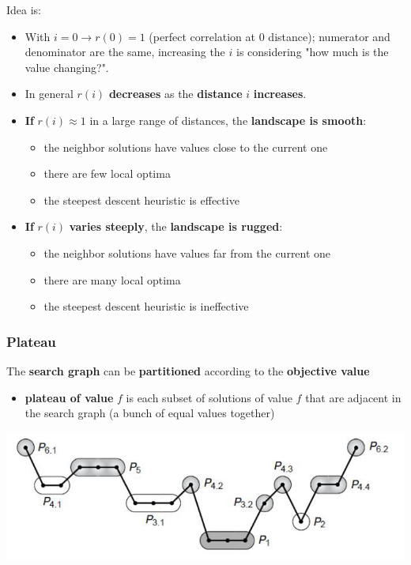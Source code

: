 \documentclass[11pt]{article}
\begin{document}
	Idea is:
	\begin{itemize}
		\item With $i=0 \rightarrow r (0) = 1$ (perfect correlation at $0$ distance); numerator and denominator are the same, increasing the $i$ is considering "how much is the value changing?".\\
		
		\item In general $r (i)$ \textbf{decreases} as the \textbf{distance} $i$ \textbf{increases}.\\
		
		\item \textbf{If} $r (i) \approx 1$ in a large range of distances, the \textbf{landscape is smooth}:
		\begin{itemize}
			\item the neighbor solutions have values close to the current one
			\item there are few local optima
			\item the steepest descent heuristic is effective
		\end{itemize}
		\nn
		
		\item \textbf{If} $r (i)$ \textbf{varies steeply}, the \textbf{landscape is rugged}:
		\begin{itemize}
			\item the neighbor solutions have values far from the current one
			\item there are many local optima
			\item the steepest descent heuristic is ineffective
		\end{itemize}
		\nn
	\end{itemize}
	
	\newpage
	
	\subsubsection{Plateau}
	The \textbf{search graph} can be \textbf{partitioned} according to the \textbf{objective value}
	\begin{itemize}
		\item \textbf{plateau of value} $f$ is each subset of solutions of value $f$ that are adjacent in the search graph (a bunch of equal values together)
	\end{itemize}
	\begin{center}
		\includegraphics[width=0.7\columnwidth]{img/plateau1}
	\end{center}
	
\end{document}
